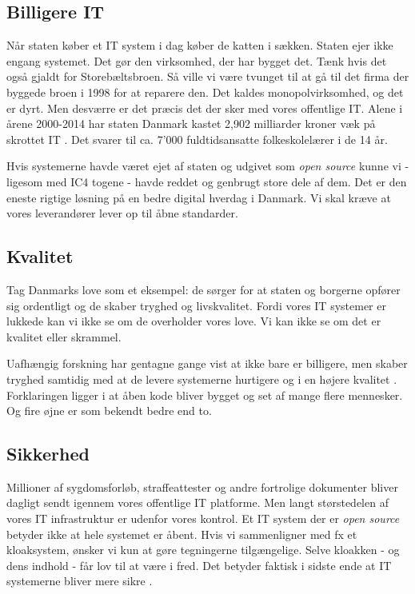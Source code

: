 \documentclass[fleqn]{article}
\begin{document}
\subsection{Billigere IT}
Når staten køber et IT system i dag køber de katten i sækken. Staten ejer ikke engang
systemet. Det gør den virksomhed, der har bygget det. Tænk hvis det også gjaldt for
Storebæltsbroen. Så ville vi være tvunget til at gå til det firma der byggede
broen i 1998 for at reparere den. Det kaldes monopolvirksomhed, og det er dyrt.
Men desværre er det præcis det der sker med vores offentlige IT. Alene i årene 
2000-2014 har staten Danmark kastet 2,902 milliarder kroner væk på skrottet IT
\cite{dr8}. Det svarer til ca. 7'000 fuldtidsansatte folkeskolelærer i de 14 år.

Hvis systemerne havde været ejet af staten og udgivet som \textit{open source} kunne vi
- ligesom med IC4 togene - havde reddet og genbrugt store dele af dem. 
Det er den eneste rigtige løsning på en bedre digital hverdag i Danmark. Vi skal kræve
at vores leverandører lever op til åbne standarder. 

\subsection{Kvalitet}
Tag Danmarks love som et eksempel: de sørger for at staten og borgerne opfører sig 
ordentligt og de skaber tryghed og livskvalitet. Fordi vores IT systemer er lukkede
kan vi ikke se om de overholder vores love. Vi kan ikke se om det er kvalitet eller skrammel.

Uafhængig forskning har gentagne gange vist at  ikke bare er billigere,
men skaber tryghed samtidig med at de levere systemerne hurtigere og i en højere kvalitet \cite{Samoladas, Reynolds}.
Forklaringen ligger i at åben kode bliver bygget og set af mange flere mennesker. Og fire
øjne er som bekendt bedre end to.

\subsection{Sikkerhed}
Millioner af sygdomsforløb, straffeattester og andre fortrolige
dokumenter bliver dagligt sendt igennem vores offentlige IT platforme. Men langt størstedelen
af vores IT infrastruktur er udenfor vores kontrol.
Et IT system der er \textit{open source} betyder ikke at hele systemet er åbent. 
Hvis vi sammenligner med fx et kloaksystem, ønsker vi kun at gøre tegningerne
tilgængelige. Selve kloakken - og dens indhold - får lov til at være i fred.
Det betyder faktisk i sidste ende at IT systemerne bliver mere sikre \cite{Samoladas, Reynolds}.
\end{document}
